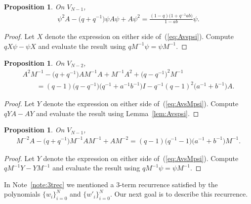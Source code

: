 \documentclass[pdftex]{sigma}
\numberwithin{equation}{section}
\newtheorem{Proposition}[Theorem]{Proposition}
\begin{document}
\begin{Proposition}\label{prop:ppA}
On $V_{N-1}$,
\begin{gather*}
\psi^2 A - \big(q+q^{-1}\big) \psi A \psi + A \psi^2 = \frac{(1-q)\big(1+ q^{-1}ab\big)}{1-ab}
\psi.
\end{gather*}
\end{Proposition}
\begin{proof} Let $X$ denote the expression on either side of~(\ref{eq:Avspsi}). Compute $qX \psi - \psi X$ and evaluate
the result using $q M^{-1}\psi = \psi M^{-1}$.
\end{proof}

\begin{Proposition}\label{prop:AAM}
On $V_{N-2}$,
\begin{gather*}
A^2 M^{-1} - \big(q+q^{-1}\big)AM^{-1}A+M^{-1}A^2 + \big(q-q^{-1}\big)^2 M^{-1}\\
\qquad{}=
(q-1)\big(q-q^{-1}\big)\big( q^{-1}+ a^{-1}b^{-1}\big) I - q^{-1}(q-1)^2 \big(a^{-1}+b^{-1}\big) A.
\end{gather*}
\end{Proposition}
\begin{proof} Let $Y$ denote the expression on either side of~(\ref{eq:AvsMpsi}). Compute $q YA - AY $
and evaluate the result using
Lemma~\ref{lem:Avspsi}.
\end{proof}

\begin{Proposition}\label{prop:MMA}On $V_{N-1}$,
\begin{gather*}
M^{-2}A - \big(q+q^{-1}\big) M^{-1} A M^{-1} + A M^{-2} =
(q-1)\big(q^{-1}-1\big)\big(a^{-1}+b^{-1}\big) M^{-1}.
\end{gather*}
\end{Proposition}
\begin{proof} Let $Y$ denote the expression on either side of~(\ref{eq:AvsMpsi}).
Compute $q M^{-1} Y - Y M^{-1}$ and evaluate the result using $q M^{-1} \psi = \psi M^{-1}$.
\end{proof}

In Note~\ref{note:3trec} we mentioned
a 3-term recurrence satisfied by the polynomials
$\lbrace w_i \rbrace_{i=0}^N$ and
$\lbrace w'_i \rbrace_{i=0}^N$.
Our next goal is to describe this recurrence.
\end{document}
